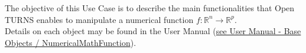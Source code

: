 \renewcommand{\filename}{docUC_LSF_NMFManipulation.tex}
\renewcommand{\filetitle}{UC : Manipulation of a NumericalMathFunction}

\HeaderIIILevel





The objective of this Use Case  is to describe the main functionalities that Open TURNS enables to manipulate a numerical function $f : \mathbb{R}^n  \longrightarrow \mathbb{R}^p$.\\

Details on each object may be found in the User Manual  (\href{OpenTURNS_UserManual_TUI.pdf}{see User Manual - Base Objects / NumericalMathFunction}).\\

